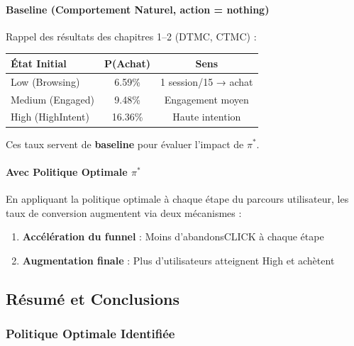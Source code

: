 \documentclass[11pt,a4paper]{article}
\renewcommand{\arraystretch}{1.35}
\begin{document}
\paragraph{Baseline (Comportement Naturel, action = nothing)}
 
Rappel des résultats des chapitres 1--2 (DTMC, CTMC) :
 
\begin{center}
\renewcommand{\arraystretch}{1.4}
\begin{tabular}{l|c|c}
\toprule
\textbf{État Initial} & \textbf{P(Achat)} & \textbf{Sens} \\
\midrule
\rowcolor{LightBlue}
Low (Browsing) & 6.59\% & 1 session/15 → achat \\
\rowcolor{LightOrange}
Medium (Engaged) & 9.48\% & Engagement moyen \\
\rowcolor{LightRed}
High (HighIntent) & 16.36\% & Haute intention \\
\bottomrule
\end{tabular}
\end{center}
 
Ces taux servent de \textbf{baseline} pour évaluer l'impact de $\pi^*$.
 
\paragraph{Avec Politique Optimale $\pi^*$}
 
En appliquant la politique optimale à chaque étape du parcours utilisateur,
les taux de conversion augmentent via deux mécanismes :
\begin{enumerate}[leftmargin=1.5cm,itemsep=2pt]
  \item \textbf{Accélération du funnel} : Moins d'abandonsCLICK à chaque étape
  \item \textbf{Augmentation finale} : Plus d'utilisateurs atteignent High et achètent
\end{enumerate}
 


\subsection{Résumé et Conclusions}
 
\subsubsection{Politique Optimale Identifiée}
 
\end{document}
